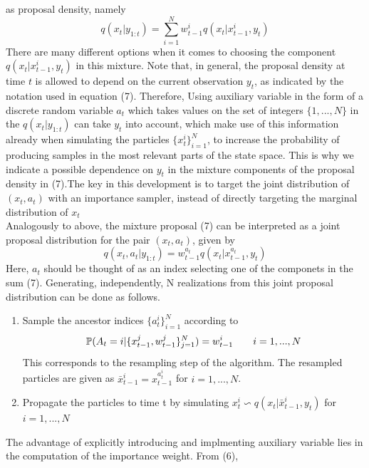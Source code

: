 \documentclass[11pt,oneside,a4paper]{article}
\begin{document}
as proposal density, namely
\begin{equation}
q(x_{t}|y_{1:t}) = \sum_{i=1}^N w_{t-1}^i q(x_t|x_{t-1}^i,y_t)
\end{equation}
There are many different options when it comes to choosing the component $q(x_{t}|x_{t-1}^{i}, y_{t}) $ in this mixture. Note that, in general, the proposal density at time $t $ is allowed to depend on the current
observation $y_{t} $, as indicated by the notation used in equation (7). Therefore, Using auxiliary variable in the form of a discrete random variable $a_{t} $ which takes values on the set of integers $\{ 1,...,N\} $ in the $q(x_t|y_{1:t}) $ can take $y_{t} $ into account, which make use of this information already when simulating
the particles $\{ x_{t}^{i} \}_{i=1}^{N} $, to increase the probability of producing samples in the most relevant parts of the state space. This is why we indicate a possible dependence on $y_{t} $ in the mixture components of
the proposal density in (7).The key in this development is to target the joint distribution of $(x_{t}, a_{t}) $ with an importance sampler, instead of directly targeting the marginal
distribution of $x_{t} $\\
Analogously to above, the mixture proposal (7) can be interpreted as a joint proposal distribution for the pair $(x_{t}, a_{t}) $, given by
\begin{equation}
q(x_{t}, a_{t} | y_{1:t}) = w_{t-1}^{a_t}q(x_{t}|x_{t-1}^{a_{t}}, y_{t})
\end{equation}
Here, $a_{t} $ should be thought of as an index selecting one of the componets in the sum (7).
Generating, independently, N realizations from this joint proposal distribution can be done as follows.\\
\flushleft
\begin{enumerate}
\item Sample the ancestor indices $ \{ a_{t}^{i} \}_{i=1}^{N} $ according to
\begin{equation}
\mathbb{P} (A_{t} = i \arrowvert \{ x_{t-1}^{j}, w_{t-1}^{j} \}_{j=1}^{N} ) = w_{t-1}^{i} \qquad i = 1,...,N
\end{equation}
This corresponds to the resampling step of the algorithm. The resampled particles are given as $ \bar{x}_{t-1}^{i} = x_{t-1}^{a_{t}^{i}} $ for $ i = 1,...,N $.
\item Propagate the particles to time t by simulating $x_{t}^{i} \backsim q(x_{t}| \bar{x}_{t-1}^{i}, y_{t}) $ for $i = 1,...,N $
\end{enumerate}
The advantage of explicitly introducing and implmenting auxiliary variable lies in the computation of the importance weight. From (6),
\end{document}
